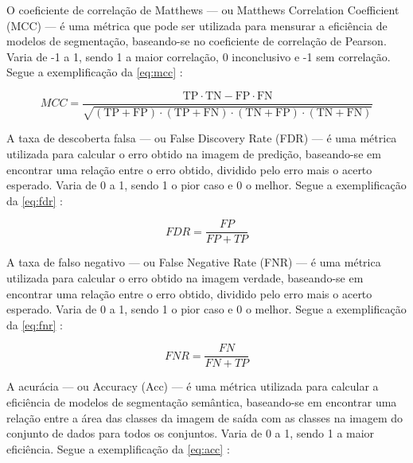 
O coeficiente de correlação de Matthews — ou Matthews Correlation Coefficient (MCC) — é uma métrica que pode ser utilizada para mensurar a eficiência de modelos de segmentação, baseando-se no coeficiente de correlação de Pearson. Varia de -1 a 1, sendo 1 a maior correlação, 0 inconclusivo e -1 sem correlação. Segue a exemplificação da \cref{eq:mcc} \space\cite{Chicco2020, confusion_matrix_calculator}:

\begin{equation}
    \label{eq:mcc}
    MCC = \frac{\text{TP} \cdot \text{TN} - \text{FP} \cdot \text{FN}}{\sqrt{(\text{TP}+\text{FP}) \cdot (\text{TP}+\text{FN}) \cdot (\text{TN}+\text{FP}) \cdot (\text{TN}+\text{FN})}}
\end{equation}


A taxa de descoberta falsa — ou False Discovery Rate (FDR) — é uma métrica utilizada para calcular o erro obtido na imagem de predição, baseando-se em encontrar uma relação entre o erro obtido, dividido pelo erro mais o acerto esperado. Varia de 0 a 1, sendo 1 o pior caso e 0 o melhor. Segue a exemplificação da \cref{eq:fdr} \space\cite{confusion_matrix_calculator}:

\begin{equation}
    \label{eq:fdr}
    FDR = \frac{FP}{FP + TP}
\end{equation}


A taxa de falso negativo — ou False Negative Rate (FNR) — é uma métrica utilizada para calcular o erro obtido na imagem verdade, baseando-se em encontrar uma relação entre o erro obtido, dividido pelo erro mais o acerto esperado. Varia de 0 a 1, sendo 1 o pior caso e 0 o melhor. Segue a exemplificação da \cref{eq:fnr} \space\cite{confusion_matrix_calculator}:

\begin{equation}
    \label{eq:fnr}
    FNR = \frac{FN}{FN + TP}
\end{equation}


A acurácia — ou Accuracy (Acc) — é uma métrica utilizada para calcular a eficiência de modelos de segmentação semântica, baseando-se em encontrar uma relação entre a área das classes da imagem de saída com as classes na imagem do conjunto de dados para todos os conjuntos. Varia de 0 a 1, sendo 1 a maior eficiência. Segue a exemplificação da \cref{eq:acc} \space\cite{Chicco2020}:

